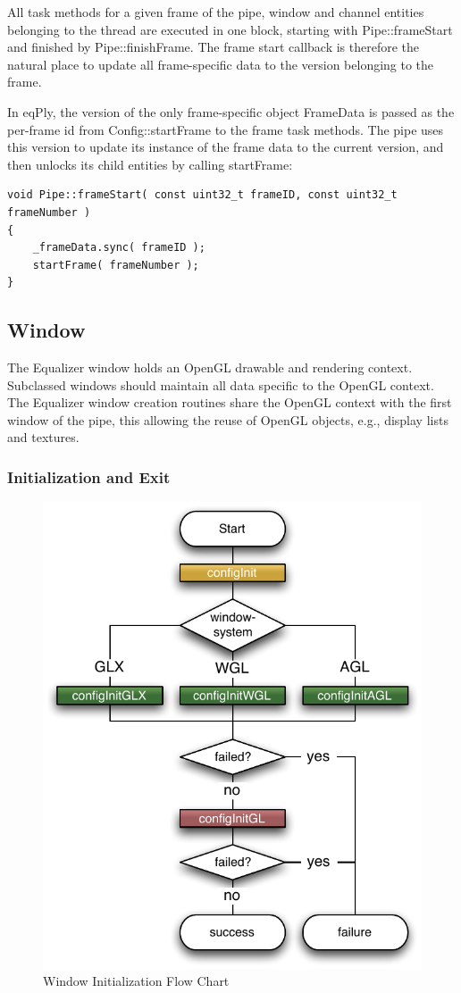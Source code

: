 \documentclass[10pt,a4]{scrartcl}
\begin{document}
All task methods for a given frame of the pipe, window and channel
entities belonging to the thread are executed in one block, starting
with \textsf{Pipe::frameStart} and finished by
\textsf{Pipe::finishFrame}. The frame start callback is therefore the
natural place to update all frame-specific data to the version belonging
to the frame. 

In \textsf{eqPly}, the version of the only frame-specific object
\textsf{FrameData} is passed as the per-frame id from
\textsf{Config::startFrame} to the frame task methods. The pipe uses
this version to update its instance of the frame data to the current
version, and then unlocks its child entities by calling
\textsf{startFrame}:

{\footnotesize\begin{lstlisting}
void Pipe::frameStart( const uint32_t frameID, const uint32_t frameNumber )
{
    _frameData.sync( frameID );
    startFrame( frameNumber );
}
\end{lstlisting}}


\subsection{Window}

The Equalizer window holds an OpenGL drawable and rendering
context. Subclassed windows should maintain all data specific to the
OpenGL context. The Equalizer window creation routines share the OpenGL
context with the first window of the pipe, this allowing the reuse of
OpenGL objects, e.g., display lists and textures.

\subsubsection{Initialization and Exit}

\begin{figure}
  \includegraphics[width=.4\textwidth]{images/windowInit.pdf}
  {\caption{\small\label{fWindowInit}Window Initialization Flow Chart}}
\end{figure}
\end{document}
